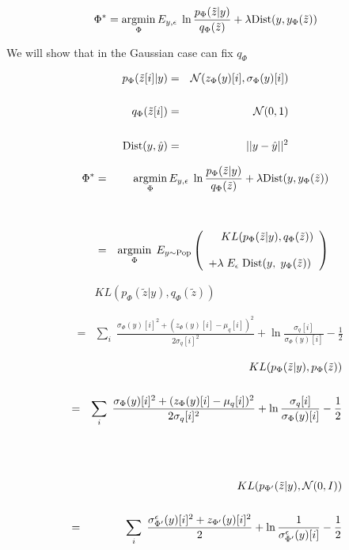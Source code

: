 {

$$\Phi^* = \operatorname*{argmin}_\Phi E_{y,\epsilon}\;\ln \frac{p_\Phi(\tilde{z}|y)}{q_\Phi(\tilde{z})} + \lambda \mathrm{Dist}(y,y_\Phi(\tilde{z}))$$

\vfill
We will show that in the Gaussian case can fix $q_\Phi$

{\color{red}
\begin{eqnarray*}
p_\Phi(\tilde{z}[i]|y) & = & {\cal N}(z_\Phi(y)[i],\sigma_\Phi(y)[i]) \\
\\
q_\Phi(\tilde{z}[i]) & = & {\cal N}(0,1) \\
\\
\mathrm{Dist}(y,\hat{y}) & = & ||y-\hat{y}||^2
\end{eqnarray*}
}



\begin{eqnarray*}
\Phi^* &  = & \operatorname*{argmin}_\Phi E_{y,\epsilon}\;\ln \frac{p_\Phi(\tilde{z}|y)}{q_\Phi(\tilde{z})} + \lambda \mathrm{Dist}(y,y_\Phi(\tilde{z})) \\
\\
\\
& = & \operatorname*{argmin}_{\Phi}\;E_{y\sim \mathrm{Pop}} \left(\begin{array}{l}\;\;\;\;KL(p_\Phi(\tilde{z}|y),q_\Phi(\tilde{z})) \\
\\
+ \lambda \; E_\epsilon\;\mathrm{Dist}(y,\;y_\Phi(\tilde{z}))\end{array}\right)
\end{eqnarray*}


\begin{eqnarray*}
& & KL(p_\Phi(\tilde{z}|y),q_\Phi(\tilde{z})) \\
\\
\\
& = & \sum_i \;\frac{\sigma_\Phi(y)[i]^2 + (z_\Phi(y)[i]-\mu_q[i])^2}{2 \sigma_q[i]^2}
+ \ln\frac{\sigma_q[i]}{\sigma_\Phi(y)[i]} - \frac{1}{2}
\end{eqnarray*}



\begin{eqnarray*}
 &  & KL(p_\Phi(\tilde{z}|y),p_\Phi(\tilde{z})) \\
 \\
 & = & \sum_i \;\frac{ \sigma_\Phi(y)[i]^2 +(z_\Phi(y)[i] - \mu_q[i])^2}{2\sigma_q[i]^2}
+ \ln\frac{\sigma_q[i]}{\sigma_\Phi(y)[i]}
- \frac{1}{2}
\\
\\
\\
\\
 &  & KL(p_{\Phi'}(\tilde{z}|y),{\cal N}(0,I)) \\
 \\
 & = & \sum_i \;\frac{\sigma^\epsilon_{\Phi'}(y)[i]^2 +z_{\Phi'}(y)[i]^2}{2} + \ln\frac{1}{\sigma^\epsilon_{\Phi'}(y)[i]} - \frac{1}{2}
\end{eqnarray*}

}
